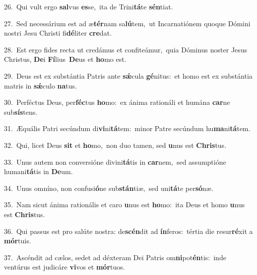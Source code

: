 {\numbfont\textcolor{\numbcolor}{26.}}~Qui vult ergo \textbf{sal}\-vus \textbf{es}\-se,~\star ita de Trini\-\textbf{tá}\-te \textbf{sén}\-tiat.\par
{\numbfont\textcolor{\numbcolor}{27.}}~Sed necessárium est ad æ\-\textbf{tér}\-nam sa\-\textbf{lú}\-tem,~\star ut Incarnatiónem quoque Dómini nostri Jesu Christi fi\-\textbf{dé}\-liter \textbf{cre}\-dat.\par
{\numbfont\textcolor{\numbcolor}{28.}}~Est ergo fides recta ut credámus et confiteámur,~\dagger quia Dóminus noster Jesus Christus, \textbf{De}\-i \textbf{Fí}\-lius~\star \textbf{De}\-us et \textbf{ho}\-mo est.\par
{\numbfont\textcolor{\numbcolor}{29.}}~Deus est ex substántia Patris ante \textbf{sǽ}\-cula \textbf{gé}\-nitus:~\star et homo est ex substántia matris in \textbf{sǽ}\-culo \textbf{na}\-tus.\par
{\numbfont\textcolor{\numbcolor}{30.}}~Perféctus Deus, per\-\textbf{féc}\-tus \textbf{ho}\-mo:~\star ex ánima rationáli et humána \textbf{car}\-ne sub\-\textbf{sís}\-tens.\par
{\numbfont\textcolor{\numbcolor}{31.}}~Æquális Patri secúndum di\-\textbf{vi}\-ni\-\textbf{tá}\-tem:~\star minor Patre secúndum hu\-\textbf{ma}\-ni\-\textbf{tá}\-tem.\par
{\numbfont\textcolor{\numbcolor}{32.}}~Qui, licet Deus \textbf{sit} et \textbf{ho}\-mo,~\star non duo tamen, sed \textbf{u}\-nus est \textbf{Chris}\-tus.\par
{\numbfont\textcolor{\numbcolor}{33.}}~Unus autem non conversióne divini\-\textbf{tá}\-tis in \textbf{car}\-nem,~\star sed assumptióne humani\-\textbf{tá}\-tis in \textbf{De}\-um.\par
{\numbfont\textcolor{\numbcolor}{34.}}~Unus omníno, non confusi\-\textbf{ó}\-ne sub\-\textbf{stán}\-tiæ,~\star sed uni\-\textbf{tá}\-te per\-\textbf{só}\-næ.\par
{\numbfont\textcolor{\numbcolor}{35.}}~Nam sicut ánima rationális et caro \textbf{u}\-nus est \textbf{ho}\-mo:~\star ita Deus et homo \textbf{u}\-nus est \textbf{Chris}\-tus.\par
{\numbfont\textcolor{\numbcolor}{36.}}~Qui passus est pro salúte nostra: de\-\textbf{scén}\-dit ad \textbf{ín}\-feros:~\star tértia die resur\-\textbf{ré}\-xit a \textbf{mór}\-tuis.\par
{\numbfont\textcolor{\numbcolor}{37.}}~Ascéndit ad cælos, sedet ad déxteram Dei Patris om\-\textbf{ni}\-pot\-\textbf{én}\-tis:~\star inde ventúrus est judicáre \textbf{vi}\-vos et \textbf{mór}\-tuos.\par
